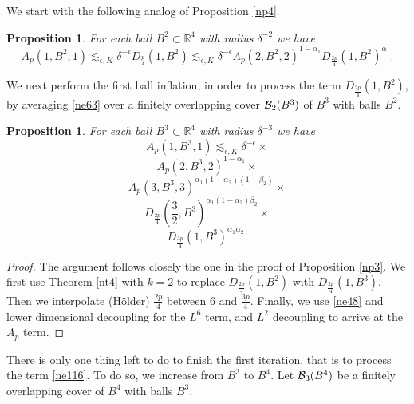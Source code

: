 \documentclass[amssymb,amsfonts,12pt]{amsart}
\newtheorem{proposition}[theorem]{Proposition}
\def\R{{\mathbb R}}
\begin{document}
We start with the following analog of Proposition \ref{np4}.
\begin{proposition}
\label{np10}
For each ball $B^2\subset \R^4$ with radius $\delta^{-2}$ we have
\begin{equation}
\label{ne63}
A_p(1,B^2,1)\lesssim_{\epsilon,K}\delta^{-\epsilon}D_{\frac{p}{4}}(1,B^2)\lesssim_{\epsilon,K}\delta^{-\epsilon}
A_p(2,B^2,2)^{1-\alpha_1}
D_{\frac{2p}{4}}(1,B^2)^{\alpha_1}.
\end{equation}
\end{proposition}
We next perform the first ball inflation, in order  to process the term $D_{\frac{2p}{4}}(1,B^2)$, by averaging \eqref{ne63} over a finitely overlapping cover ${\mathcal B}_2(B^3)$ of $B^3$ with balls $B^2$.
\begin{proposition}
\label{np11}
For each ball $B^3\subset \R^4$ with radius $\delta^{-3}$ we have
$$A_p(1,B^3,1)\lesssim_{\epsilon,K}\delta^{-\epsilon}\times$$
\begin{equation}\label{ne112}
A_p(2,B^3,2)^{1-\alpha_1}\times\end{equation}\begin{equation}
\label{ne114}A_p(3,B^3,3)^{\alpha_1(1-\alpha_2)(1-\beta_2)}\times\end{equation}\begin{equation}
\label{ne115}D_{\frac{2p}{4}}(\frac32,B^3)^{\alpha_1(1-\alpha_2)\beta_2}\times\end{equation}\begin{equation}
\label{ne116}D_{\frac{3p}4}(1,B^3)^{\alpha_1\alpha_2}.
\end{equation}
\end{proposition}
\begin{proof}
The argument follows closely the one in the proof of Proposition \ref{np3}. We first use Theorem \ref{nt4} with $k=2$ to replace $D_{\frac{2p}{4}}(1,B^2)$ with $D_{\frac{2p}{4}}(1,B^3)$. Then we interpolate (H\"older) $\frac{2p}{4}$ between $6$ and $\frac{3p}{4}$. Finally, we use \eqref{ne48} and lower dimensional decoupling for the $L^6$ term, and $L^2$ decoupling to arrive at  the $A_p$ term.

\end{proof}
There is only one thing left to do to finish the first iteration, that is to process the term \eqref{ne116}. To do so, we increase from $B^3$ to $B^4$. Let ${\mathcal B}_3(B^4)$ be a finitely overlapping cover of $B^4$ with balls $B^3$.
\end{document}

